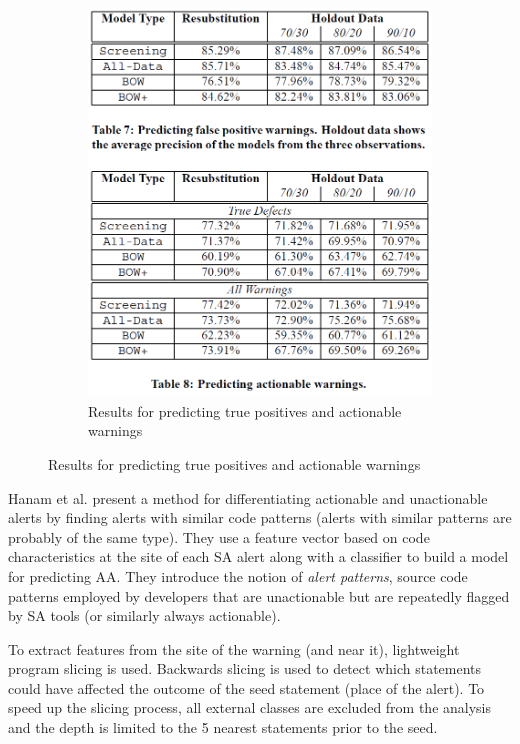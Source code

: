 \documentclass{article}
\begin{document}
\begin{figure}[H]
\begin{subfigure}{.5\textwidth}
         \includegraphics[scale=0.3]{./src/actionable_warnings_results.png}
         \caption{Results for predicting true positives and actionable warnings}\label{act:results}
     \end{subfigure}
 \end{figure}


 Hanam et al. \cite{alert_patterns} present a method for differentiating actionable and unactionable alerts by finding alerts with similar code patterns (alerts with similar patterns are probably of the same type). They use a feature vector based on code characteristics at the site of each SA alert along with a classifier to build a model for predicting AA. They introduce the notion of \textit{alert patterns}, source code patterns employed by developers that are unactionable but are repeatedly flagged by SA tools (or similarly always actionable).

 To extract features from the site of the warning (and near it), lightweight program slicing is used. Backwards slicing is used to detect which statements could have affected the outcome of the seed statement (place of the alert). To speed up the slicing process, all external classes are excluded from the analysis and the depth is limited to the 5 nearest statements prior to the seed.
\end{document}
